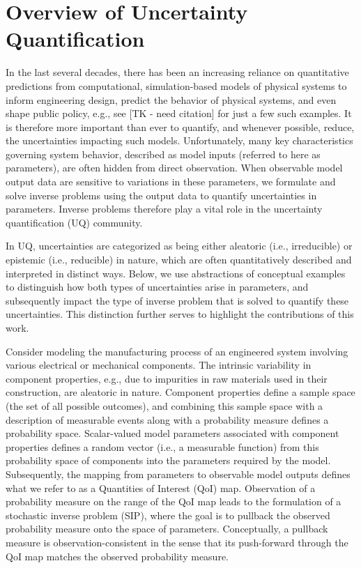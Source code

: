 \section{Overview of Uncertainty Quantification}\label{sec:intro}

In the last several decades, there has been an increasing reliance on quantitative predictions from computational, simulation-based models of physical systems to inform engineering design, predict the behavior of physical systems, and even shape public policy, e.g., see [TK - need citation] for just a few such examples.
It is therefore more important than ever to quantify, and whenever possible, reduce, the uncertainties impacting such models.
Unfortunately, many key characteristics governing system behavior, described as model inputs (referred to here as parameters), are often hidden from direct observation.
When observable model output data are sensitive to variations in these parameters, we formulate and solve inverse problems using the output data to quantify uncertainties in parameters.
Inverse problems therefore play a vital role in the uncertainty quantification (UQ) community.

In UQ, uncertainties are categorized as being either aleatoric (i.e., irreducible) or epistemic (i.e., reducible) in nature, which are often quantitatively described and interpreted in distinct ways.
Below, we use abstractions of conceptual examples to distinguish how both types of uncertainties arise in parameters, and subsequently impact the type of inverse problem that is solved to quantify these uncertainties.
This distinction further serves to highlight the contributions of this work.

Consider modeling the manufacturing process of an engineered system involving various electrical or mechanical components.
The intrinsic variability in component properties, e.g., due to impurities in raw materials used in their construction, are aleatoric in nature.
Component properties define a sample space (the set of all possible outcomes), and combining this sample space with a description of measurable events along with a probability measure defines a probability space.
Scalar-valued model parameters associated with component properties defines a random vector (i.e., a measurable function) from this probability space of components into the parameters required by the model.
Subsequently, the mapping from parameters to observable model outputs defines what we refer to as a Quantities of Interest (QoI) map.
Observation of a probability measure on the range of the QoI map leads to the formulation of a stochastic inverse problem (SIP), where the goal is to pullback the observed probability measure onto the space of parameters.
Conceptually, a pullback measure is observation-consistent in the sense that its push-forward through the QoI map matches the observed probability measure.

